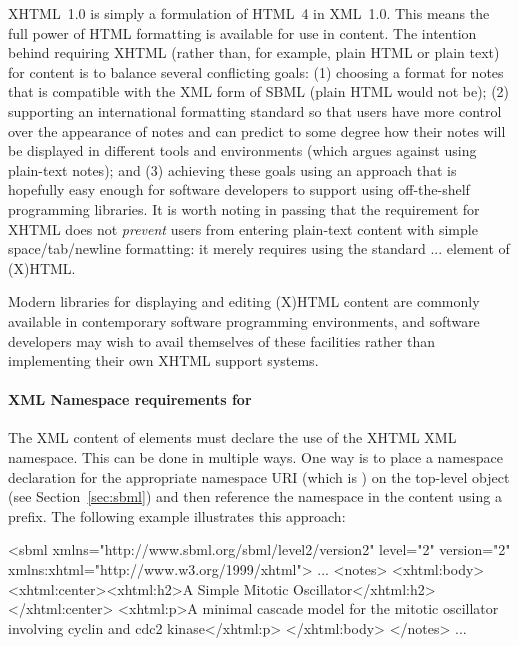 XHTML~1.0 is simply a formulation of HTML~4 in XML~1.0.  This
means the full power of HTML formatting is available for use in
 content.  The intention behind requiring XHTML
(rather than, for example, plain HTML or plain text) for
 content is to balance several conflicting goals: (1)
choosing a format for notes that is compatible with the XML form of
SBML (plain HTML would not be); (2) supporting an international
formatting standard so that users have more control over the
appearance of notes and can predict to some degree how their notes
will be displayed in different tools and environments (which
argues against using plain-text notes); and (3) achieving these
goals using an approach that is hopefully easy enough for software
developers to support using off-the-shelf programming libraries.
It is worth noting in passing that the requirement for XHTML does
not \emph{prevent} users from entering plain-text content with
simple space/tab/newline formatting: it merely requires using the
standard ... element of (X)HTML.

Modern libraries for displaying and editing (X)HTML content are
commonly available in contemporary software programming
environments, and software developers may wish to avail themselves
of these facilities rather than implementing their own XHTML
support systems.


\paragraph{XML Namespace requirements for }

The XML content of  elements must declare the use of
the XHTML XML namespace.  This can be done in multiple ways.  One
way is to place a namespace declaration for the appropriate
namespace URI (which is ) on the
top-level \Sbml object (see Section~\ref{sec:sbml}) and then
reference the namespace in the  content using a
prefix.  The following example illustrates this approach:

\begin{example}
<sbml xmlns="http://www.sbml.org/sbml/level2/version2" level="2" version="2"
      xmlns:xhtml="http://www.w3.org/1999/xhtml">
  ...
  <notes>
    <xhtml:body>
      <xhtml:center><xhtml:h2>A Simple Mitotic Oscillator</xhtml:h2></xhtml:center>
      <xhtml:p>A minimal cascade model for the mitotic oscillator
      involving cyclin and cdc2 kinase</xhtml:p>
    </xhtml:body>
  </notes>
  ...
\end{example}

